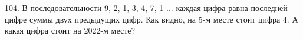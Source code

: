 104. В последовательности 9, 2, 1, 3, 4, 7, 1 ... каждая цифра равна последней цифре суммы двух предыдущих цифр. Как видно, на 5-м месте стоит цифра 4. А какая цифра стоит на 2022-м месте?\\
